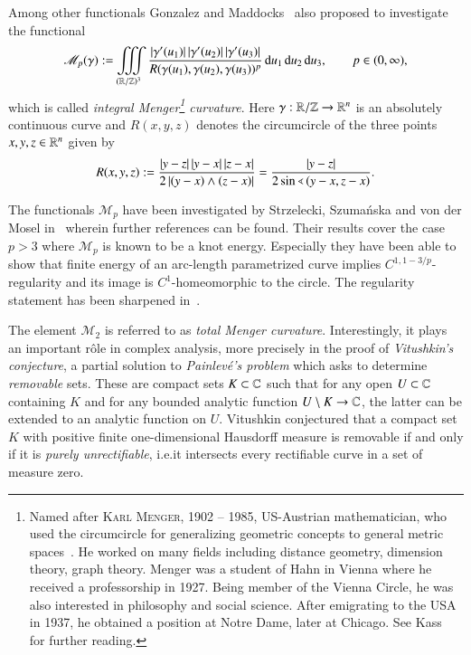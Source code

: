 Among other functionals Gonzalez and Maddocks~\cite{gonz-madd} also proposed
to investigate the functional
\[ \mathscr M_{p}(\gamma) := \iiint\limits_{(\mathbb{R}/\mathbb{Z})^{3}}
 \frac{\left|{\gamma}'(u_{1})\right|\left|{\gamma}'(u_{2})\right|\left|{\gamma}'(u_{3})\right|}{R(\gamma(u_{1}),\gamma(u_{2}),\gamma(u_{3}))^{p}} \,\mathrm{d} u_{1}\,\mathrm{d} u_{2}\,\mathrm{d} u_{3}, \qquad p\in(0,\infty), \]
which is called \emph{integral Menger\footnote{%
Named after \textsc{Karl Menger}, 1902 -- 1985, US-Austrian mathematician,
who used the circumcircle for generalizing geometric concepts
to general metric spaces~\cite{menger}.
He worked on many fields including
distance geometry, dimension theory, graph theory.
Menger was a student of Hahn in Vienna
where he received a professorship in 1927.
Being member of the Vienna Circle, he was also
interested in philosophy and social science.
After emigrating to the USA in 1937,
he obtained a position at Notre Dame, later at Chicago.
See Kass~\cite{kass:menger} for further reading.
}%
curvature}.
Here $\gamma:\mathbb{R}/\mathbb{Z}\to\mathbb{R}^{n}$ is an absolutely continuous curve and
$R(x,y,z)$ denotes the circumcircle 
of the three points $x,y,z\in\mathbb{R}^{n}$ given by 
\begin{equation}
 R(x,y,z):= \frac{{\left|y-z\right|\left|y-x\right|\left|z-x\right|}}{2\left|\left(y-x\right)\wedge\left(z-x\right)\right|}=\frac{\left|y-z\right|}{2\sin\sphericalangle\left(y-x,z-x\right)}.
\end{equation}

The functionals $\mathscr M_{p}$ have been investigated by
Strzelecki, Szuma\'nska and von der Mosel in~\cite{SM5}
wherein further references can be found.
Their results cover the case $p>3$ where $\mathscr M_{p}$
is known to be a knot energy.
Especially they have been able to show that
finite energy of an arc-length parametrized curve
implies $C^{1,1-3/p}$-regularity
and its image is $C^{1}$-homeomorphic to the circle.
The regularity statement has been sharpened in~\cite{blatt:imcc}.

The element $\mathscr M_{2}$ is referred to as \emph{total Menger curvature}.
Interestingly, it plays an important r\^ole in complex analysis,
more precisely in the proof of
\emph{Vitushkin’s conjecture},
a partial solution to \emph{Painlev\'e's problem}
which asks to determine \emph{removable} sets.
These are compact sets $K\subset\mathbb{C}$
such that for any open $U\subset\mathbb{C}$ containing $K$
and for any bounded analytic function $U\setminus K\to\mathbb{C}$,
the latter can be extended to an analytic function on $U$.
Vitushkin conjectured that a compact set $K$ with positive finite
one-dimensional Hausdorff measure is
removable if and only if it is \emph{purely unrectifiable},
i.e.\@ it intersects every rectifiable curve in a set of measure zero.

